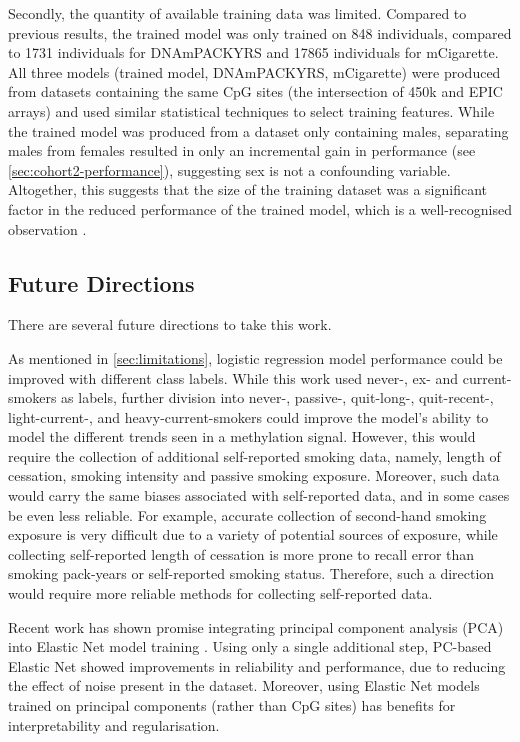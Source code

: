 \documentclass{article}
\begin{document}
Secondly, the quantity of available training data was limited. Compared to previous results, the trained model was only trained on 848 individuals, compared to \num{1731} individuals for DNAmPACKYRS and \num{17865} individuals for mCigarette. All three models (trained model, DNAmPACKYRS, mCigarette) were produced from datasets containing the same CpG sites (the intersection of 450k and EPIC arrays) and used similar statistical techniques to select training features. While the trained model was produced from a dataset only containing males, separating males from females resulted in only an incremental gain in performance (see \ref{sec:cohort2-performance}), suggesting sex is not a confounding variable. Altogether, this suggests that the size of the training dataset was a significant factor in the reduced performance of the trained model, which is a well-recognised observation \cite{bishop2006pattern}. 

\subsection{Future Directions}
There are several future directions to take this work.

As mentioned in \ref{sec:limitations}, logistic regression model performance could be improved with different class labels. While this work used never-, ex- and current-smokers as labels, further division into never-, passive-, quit-long-, quit-recent-, light-current-, and heavy-current-smokers could improve the model's ability to model the different trends seen in a methylation signal. However, this would require the collection of additional self-reported smoking data, namely, length of cessation, smoking intensity and passive smoking exposure. Moreover, such data would carry the same biases associated with self-reported data, and in some cases be even less reliable. For example, accurate collection of second-hand smoking exposure is very difficult due to a variety of potential sources of exposure, while collecting self-reported length of cessation is more prone to recall error than smoking pack-years or self-reported smoking status. Therefore, such a direction would require more reliable methods for collecting self-reported data. 

Recent work has shown promise integrating principal component analysis (PCA) into Elastic Net model training \cite{higgins2022computational}. Using only a single additional step, PC-based Elastic Net showed improvements in reliability and performance, due to reducing the effect of noise present in the dataset. Moreover, using Elastic Net models trained on principal components (rather than CpG sites) has benefits for interpretability and regularisation. 
\end{document}
